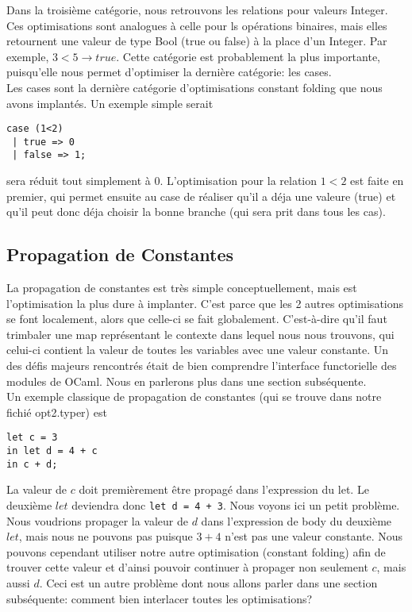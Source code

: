 \documentclass{article}
\begin{document}
Dans la troisième catégorie, nous retrouvons les relations pour valeurs Integer. Ces optimisations sont analogues à celle pour ls opérations binaires, mais elles retournent une valeur de type Bool (true ou false) à la place d'un Integer. Par exemple, $3<5 \rightarrow true$. Cette catégorie est probablement la plus importante, puisqu'elle nous permet d'optimiser la dernière catégorie: les cases. \\

Les cases sont la dernière catégorie d'optimisations constant folding que nous avons implantés. Un exemple simple serait
\begin{verbatim}
case (1<2)
 | true => 0
 | false => 1;
\end{verbatim}
sera réduit tout simplement à 0. L'optimisation pour la relation $1<2$ est faite en premier, qui permet ensuite au case de réaliser qu'il a déja une valeure (true) et qu'il peut donc déja choisir la bonne branche (qui sera prit dans tous les cas).

\subsection{Propagation de Constantes}

La propagation de constantes est très simple conceptuellement, mais est l'optimisation la plus dure à implanter. C'est parce que les 2 autres optimisations se font localement, alors que celle-ci se fait globalement. C'est-à-dire qu'il faut trimbaler une map représentant le contexte dans lequel nous nous trouvons, qui celui-ci contient la valeur de toutes les variables avec une valeur constante. Un des défis majeurs rencontrés était de bien comprendre l'interface functorielle des modules de OCaml. Nous en parlerons plus dans une section subséquente. \\

Un exemple classique de propagation de constantes (qui se trouve dans notre fichié opt2.typer) est
\begin{verbatim}
let c = 3
in let d = 4 + c
in c + d;
\end{verbatim}
La valeur de $c$ doit premièrement être propagé dans l'expression du let. Le deuxième $let$ deviendra donc \verb|let d = 4 + 3|. Nous voyons ici un petit problème. Nous voudrions propager la valeur de $d$ dans l'expression de body du deuxième $let$, mais nous ne pouvons pas puisque $3+4$ n'est pas une valeur constante. Nous pouvons cependant utiliser notre autre optimisation (constant folding) afin de trouver cette valeur et d'ainsi pouvoir continuer à propager non seulement $c$, mais aussi $d$. Ceci est un autre problème dont nous allons parler dans une section subséquente: comment bien interlacer toutes les optimisations?
\end{document}
